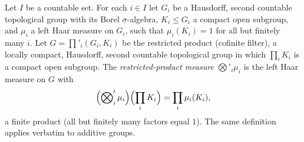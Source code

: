 Let $I$ be a countable set. For each $i\in I$ let $G_i$ be a Hausdorff, second countable topological group with its
Borel $\sigma$-algebra, $K_i\le G_i$ a compact open subgroup, and $\mu_i$ a left Haar measure on $G_i$, such that
$\mu_i(K_i)=1$ for all but finitely many $i$. Let $G=\prod'_i(G_i,K_i)$ be the restricted product (cofinite filter), a
locally compact, Hausdorff, second countable topological group in which $\prod_iK_i$ is a compact open subgroup. The
\emph{restricted-product measure} $\bigotimes'_i\mu_i$ is the left Haar measure on $G$ with
\[
  \Bigl(\bigotimes\nolimits'_i\mu_i\Bigr)\Bigl(\prod_iK_i\Bigr)=\prod_i\mu_i(K_i),
\]
a finite product (all but finitely many factors equal $1$). The same definition applies verbatim to additive groups.
